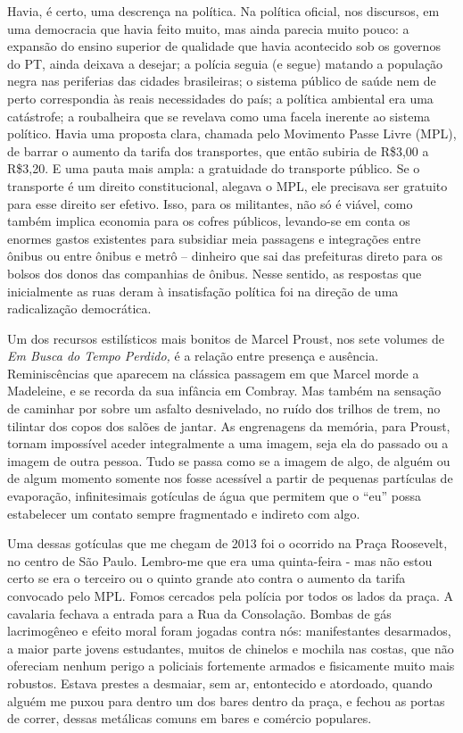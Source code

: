 Havia, é certo, uma descrença na política. Na política oficial, nos
discursos, em uma democracia que havia feito muito, mas ainda parecia
muito pouco: a expansão do ensino superior de qualidade que havia
acontecido sob os governos do PT, ainda deixava a desejar; a polícia
seguia (e segue) matando a população negra nas periferias das cidades
brasileiras; o sistema público de saúde nem de perto correspondia às
reais necessidades do país; a política ambiental era uma catástrofe; a
roubalheira que se revelava como uma facela inerente ao sistema
político. Havia uma proposta clara, chamada pelo Movimento Passe Livre
(MPL), de barrar o aumento da tarifa dos transportes, que então subiria
de R\$3,00 a R\$3,20. E uma pauta mais ampla: a gratuidade do transporte
público. Se o transporte é um direito constitucional, alegava o MPL, ele
precisava ser gratuito para esse direito ser efetivo. Isso, para os
militantes, não só é viável, como também implica economia para os cofres
públicos, levando-se em conta os enormes gastos existentes para
subsidiar meia passagens e integrações entre ônibus ou entre ônibus e
metrô -- dinheiro que sai das prefeituras direto para os bolsos dos
donos das companhias de ônibus. Nesse sentido, as respostas que
inicialmente as ruas deram à insatisfação política foi na direção de uma
radicalização democrática.

Um dos recursos estilísticos mais bonitos de Marcel Proust, nos sete
volumes de \emph{Em Busca do Tempo Perdido,} é a relação entre presença
e ausência. Reminiscências que aparecem na clássica passagem em que
Marcel morde a Madeleine, e se recorda da sua infância em Combray. Mas
também na sensação de caminhar por sobre um asfalto desnivelado, no
ruído dos trilhos de trem, no tilintar dos copos dos salões de jantar.
As engrenagens da memória, para Proust, tornam impossível aceder
integralmente a uma imagem, seja ela do passado ou a imagem de outra
pessoa. Tudo se passa como se a imagem de algo, de alguém ou de algum
momento somente nos fosse acessível a partir de pequenas partículas de
evaporação, infinitesimais gotículas de água que permitem que o ``eu''
possa estabelecer um contato sempre fragmentado e indireto com algo.

Uma dessas gotículas que me chegam de 2013 foi o ocorrido na Praça
Roosevelt, no centro de São Paulo. Lembro-me que era uma quinta-feira -
mas não estou certo se era o terceiro ou o quinto grande ato contra o
aumento da tarifa convocado pelo MPL. Fomos cercados pela polícia por
todos os lados da praça. A cavalaria fechava a entrada para a Rua da
Consolação. Bombas de gás lacrimogêneo e efeito moral foram jogadas
contra nós: manifestantes desarmados, a maior parte jovens estudantes,
muitos de chinelos e mochila nas costas, que não ofereciam nenhum perigo
a policiais fortemente armados e fisicamente muito mais robustos. Estava
prestes a desmaiar, sem ar, entontecido e atordoado, quando alguém me
puxou para dentro um dos bares dentro da praça, e fechou as portas de
correr, dessas metálicas comuns em bares e comércio populares.

